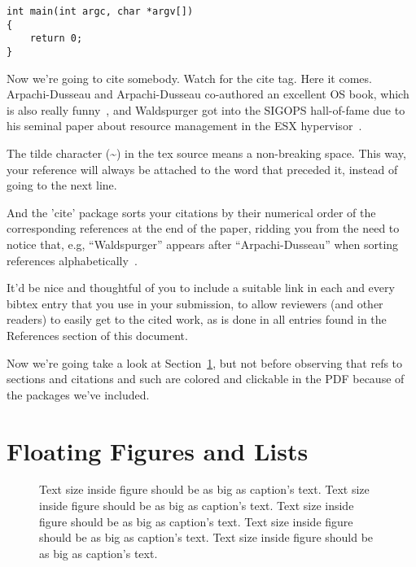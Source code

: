 \begin{verbatim}
int main(int argc, char *argv[]) 
{
    return 0;
}
\end{verbatim}

Now we're going to cite somebody. Watch for the cite tag. Here it
comes. Arpachi-Dusseau and Arpachi-Dusseau co-authored an excellent OS
book, which is also really funny~\cite{fblinchpin}, and
Waldspurger got into the SIGOPS hall-of-fame due to his seminal paper
about resource management in the ESX hypervisor~\cite{fbphotocaching}.

The tilde character (\~{}) in the tex source means a non-breaking
space. This way, your reference will always be attached to the word
that preceded it, instead of going to the next line.

And the 'cite' package sorts your citations by their numerical order
of the corresponding references at the end of the paper, ridding you
from the need to notice that, e.g, ``Waldspurger'' appears after
``Arpachi-Dusseau'' when sorting references
alphabetically~\cite{fblinchpin, fbphotocaching}. 

It'd be nice and thoughtful of you to include a suitable link in each
and every bibtex entry that you use in your submission, to allow
reviewers (and other readers) to easily get to the cited work, as is
done in all entries found in the References section of this document.

Now we're going take a look at Section~\ref{sec:figs}, but not before
observing that refs to sections and citations and such are colored and
clickable in the PDF because of the packages we've included.

\section{Floating Figures and Lists}
\label{sec:figs}


\begin{figure}
\begin{center}
\end{center}
\caption{\label{fig:vectors} Text size inside figure should be as big as
  caption's text. Text size inside figure should be as big as
  caption's text. Text size inside figure should be as big as
  caption's text. Text size inside figure should be as big as
  caption's text. Text size inside figure should be as big as
  caption's text. }
\end{figure}


